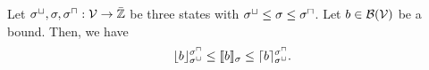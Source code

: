 \begin{theorem}
  Let ${\sigma^\sqcup}, \sigma, {\sigma^\sqcap}: \mathcal{V} \rightarrow \bar{\mathbb{Z}}$ be three states with ${\sigma^\sqcup} \leq \sigma \leq {\sigma^\sqcap}$.
  Let $b \in \mathcal{B}(\mathcal{V})$ be a bound.
  Then, we have
  \[ \lfloor b \rfloor^{{\sigma^\sqcap}}_{{\sigma^\sqcup}} \leq \llbracket b \rrbracket_{\sigma} \leq \lceil b \rceil^{{\sigma^\sqcap}}_{{\sigma^\sqcup}}. \]
\end{theorem}
